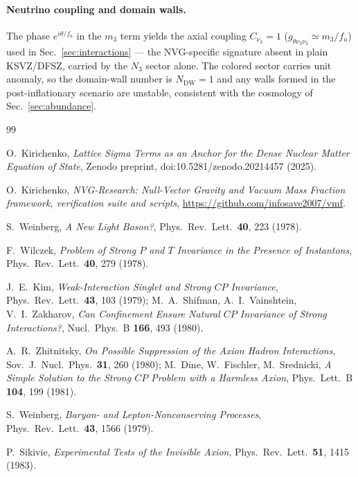\documentclass[11pt,a4paper]{article}
\begin{document}
\paragraph{Neutrino coupling and domain walls.} The phase
$e^{i\theta/f_a}$ in the $m_3$ term yields the axial coupling
$C_{\nu_3} = 1$ ($g_{\theta\nu_3\nu_3} \simeq m_3/f_a$) used in
Sec.~\ref{sec:interactions} --- the NVG-specific signature absent in plain
KSVZ/DFSZ, carried by the $N_3$ sector alone. The colored sector carries
unit anomaly, so the domain-wall
number is $N_{\mathrm{DW}} = 1$ and any walls formed in the post-inflationary
scenario are unstable, consistent with the cosmology of
Sec.~\ref{sec:abundance}.

\begin{thebibliography}{99}

O.~Kirichenko,
\emph{Lattice Sigma Terms as an Anchor for the Dense Nuclear Matter Equation of State},
Zenodo preprint, doi:10.5281/zenodo.20214457 (2025).

O.~Kirichenko,
\emph{NVG-Research: Null-Vector Gravity and Vacuum Mass Fraction framework,
verification suite and scripts},
\url{https://github.com/infosave2007/vmf}.

S.~Weinberg,
\emph{A New Light Boson?},
Phys.\ Rev.\ Lett.\ \textbf{40}, 223 (1978).

F.~Wilczek,
\emph{Problem of Strong $P$ and $T$ Invariance in the Presence of Instantons},
Phys.\ Rev.\ Lett.\ \textbf{40}, 279 (1978).

J.~E.~Kim,
\emph{Weak-Interaction Singlet and Strong $CP$ Invariance},
Phys.\ Rev.\ Lett.\ \textbf{43}, 103 (1979);
M.~A.~Shifman, A.~I.~Vainshtein, V.~I.~Zakharov,
\emph{Can Confinement Ensure Natural $CP$ Invariance of Strong Interactions?},
Nucl.\ Phys.\ B \textbf{166}, 493 (1980).

A.~R.~Zhitnitsky,
\emph{On Possible Suppression of the Axion Hadron Interactions},
Sov.\ J.\ Nucl.\ Phys.\ \textbf{31}, 260 (1980);
M.~Dine, W.~Fischler, M.~Srednicki,
\emph{A Simple Solution to the Strong $CP$ Problem with a Harmless Axion},
Phys.\ Lett.\ B \textbf{104}, 199 (1981).

S.~Weinberg,
\emph{Baryon- and Lepton-Nonconserving Processes},
Phys.\ Rev.\ Lett.\ \textbf{43}, 1566 (1979).

P.~Sikivie,
\emph{Experimental Tests of the Invisible Axion},
Phys.\ Rev.\ Lett.\ \textbf{51}, 1415 (1983).


\end{thebibliography}
\end{document}

